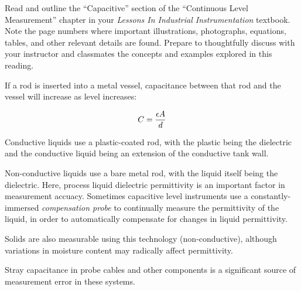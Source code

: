 

Read and outline the ``Capacitive'' section of the ``Continuous Level Measurement'' chapter in your {\it Lessons In Industrial Instrumentation} textbook.  Note the page numbers where important illustrations, photographs, equations, tables, and other relevant details are found.  Prepare to thoughtfully discuss with your instructor and classmates the concepts and examples explored in this reading.














If a rod is inserted into a metal vessel, capacitance between that rod and the vessel will increase as level increases:

$$C = {\epsilon A \over d}$$

Conductive liquids use a plastic-coated rod, with the plastic being the dielectric and the conductive liquid being an extension of the conductive tank wall.

\vskip 10pt

Non-conductive liquids use a bare metal rod, with the liquid itself being the dielectric.  Here, process liquid dielectric permittivity is an important factor in measurement accuacy.  Sometimes capacitive level instruments use a constantly-immersed {\it compensation probe} to continually measure the permittivity of the liquid, in order to automatically compensate for changes in liquid permittivity.

\vskip 10pt

Solids are also measurable using this technology (non-conductive), although variations in moisture content may radically affect permittivity.

\vskip 10pt

Stray capacitance in probe cables and other components is a significant source of measurement error in these systems.











